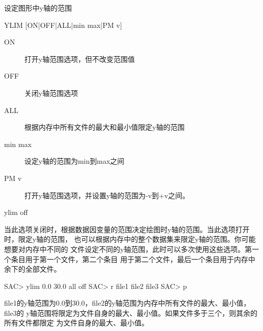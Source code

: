 \label{cmd:ylim}

设定图形中y轴的范围

\begin{SACSTX}
YLIM [ON|OFF|ALL|min max|PM v]
\end{SACSTX}

\begin{description}
\item [ON] 打开y轴范围选项，但不改变范围值
\item [OFF] 关闭y轴范围选项
\item [ALL] 根据内存中所有文件的最大和最小值限定y轴的范围
\item [min max] 设定y轴的范围为min到max之间
\item [PM v] 打开y轴范围选项，并设置y轴的范围为-v到+v之间。
\end{description}

\begin{SACDFT}
ylim off
\end{SACDFT}

当此选项关闭时，根据数据因变量的范围决定绘图时y轴的范围。当此选项打开时，限定y轴的范围，
也可以根据内存中的整个数据集来限定y轴的范围。你可能想要对内存中不同的
文件设定不同的y轴范围，此时可以多次使用这些选项。第一个条目用于第一个文件，第二个条目
用于第二个文件，最后一个条目用于内存中余下的全部文件。

\begin{SACCode}
SAC> ylim 0.0 30.0 all off
SAC> r file1 file2 file3
SAC> p
\end{SACCode}
file1的y轴范围为0.0到30.0，file2的y轴范围为内存中所有文件的最大、最小值，file3的
y轴范围将限定为文件自身的最大、最小值。如果文件多于三个，则其余的所有文件都限定
为文件自身的最大、最小值。

